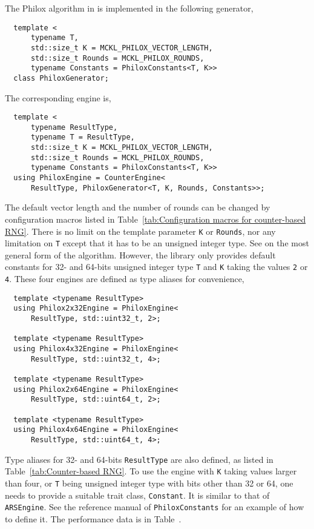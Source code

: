 The Philox algorithm in \textcite{Salmon:2011um} is implemented in the
following generator,
\begin{Verbatim}
  template <
      typename T,
      std::size_t K = MCKL_PHILOX_VECTOR_LENGTH,
      std::size_t Rounds = MCKL_PHILOX_ROUNDS,
      typename Constants = PhiloxConstants<T, K>>
  class PhiloxGenerator;
\end{Verbatim}
The corresponding \rng engine is,
\begin{Verbatim}
  template <
      typename ResultType,
      typename T = ResultType,
      std::size_t K = MCKL_PHILOX_VECTOR_LENGTH,
      std::size_t Rounds = MCKL_PHILOX_ROUNDS,
      typename Constants = PhiloxConstants<T, K>>
  using PhiloxEngine = CounterEngine<
      ResultType, PhiloxGenerator<T, K, Rounds, Constants>>;
\end{Verbatim}
The default vector length and the number of rounds can be changed by
configuration macros listed in Table~\ref{tab:Configuration macros for
  counter-based RNG}. There is no limit on the template parameter \verb|K| or
\verb|Rounds|, nor any limitation on \verb|T| except that it has to be an
unsigned integer type. See \textcite{Salmon:2011um} on the most general form of
the algorithm. However, the library only provides default constants for 32- and
64-bits unsigned integer type \verb|T| and \verb|K| taking the values \verb|2|
or \verb|4|. These four engines are defined as type aliases for convenience,
\begin{Verbatim}
  template <typename ResultType>
  using Philox2x32Engine = PhiloxEngine<
      ResultType, std::uint32_t, 2>;

  template <typename ResultType>
  using Philox4x32Engine = PhiloxEngine<
      ResultType, std::uint32_t, 4>;

  template <typename ResultType>
  using Philox2x64Engine = PhiloxEngine<
      ResultType, std::uint64_t, 2>;

  template <typename ResultType>
  using Philox4x64Engine = PhiloxEngine<
      ResultType, std::uint64_t, 4>;
\end{Verbatim}
Type aliases for 32- and 64-bits \verb|ResultType| are also defined, as listed
in Table~\ref{tab:Counter-based RNG}. To use the engine with \verb|K| taking
values larger than four, or \verb|T| being unsigned integer type with bits
other than 32 or 64, one needs to provide a suitable trait class,
\verb|Constant|. It is similar to that of \verb|ARSEngine|. See the reference
manual of \verb|PhiloxConstants| for an example of how to define it. The
performance data is in Table~.

